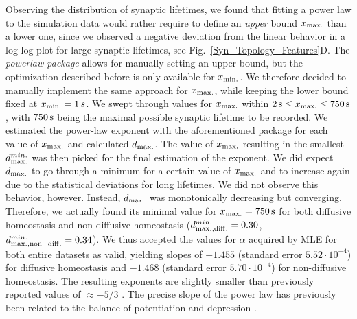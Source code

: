\documentclass[10pt,letterpaper]{article}
\begin{document}
Observing the distribution of synaptic lifetimes, we found that fitting a power law to the simulation data would rather require to define an \emph{upper} bound $x_{\rm max.}$ than a lower one, since we observed a negative deviation from the linear behavior in a log-log plot for large synaptic lifetimes, see Fig.~\ref{Syn_Topology_Features}D. The \textit{powerlaw package} allows for manually setting an upper bound, but the optimization described before is only available for $x_{\rm min.}$. We therefore decided to manually implement the same approach for $x_{\rm max.}$, while keeping the lower bound fixed at $x_{\rm min.} = 1 \, s$.
We swept through values for $x_{\rm max.}$ within $\mathrm{2\,s} \leq x_{\rm max.} \leq \mathrm{750\,s}$, with $\rm 750 \, s$ being the maximal possible synaptic lifetime to be recorded. We estimated the power-law exponent with the aforementioned package for each value of $x_{\rm max.}$ and calculated $d_{\rm max.}$. The value of $x_{\rm max.}$ resulting in the smallest $d_{\rm max.}^{min.}$ was then picked for the final estimation of the exponent. We did expect $d_{\rm max.}$ to go through a minimum for a certain value of $x_{\rm max.}$ and to increase again due to the statistical deviations for long lifetimes. We did not observe this behavior, however. Instead, $d_{\rm max.}$ was monotonically decreasing but converging. Therefore, we actually found its minimal value for $x_{\rm max.} = \rm 750 \, s$ for both diffusive homeostasis and non-diffusive homeostasis ($d_{\rm max.,diff.}^{min.} = 0.30$, $d_{\rm max.,non-diff.}^{min.} = 0.34$). We thus accepted the values for $\alpha$ acquired by MLE for both entire datasets as valid, yielding slopes of $-1.455$ (standard error $5.52\cdot 10^{-4}$) for diffusive homeostasis and $-1.468$ (standard error $5.70\cdot 10^{-4}$) for non-diffusive homeostasis. The resulting exponents are slightly smaller than previously reported values of $\mathrm{\approx - 5/3}$ \cite{SORN_Paper}. The precise slope of the power law has previously been related to the balance of potentiation and depression \cite{SORN_Paper}.
\end{document}

